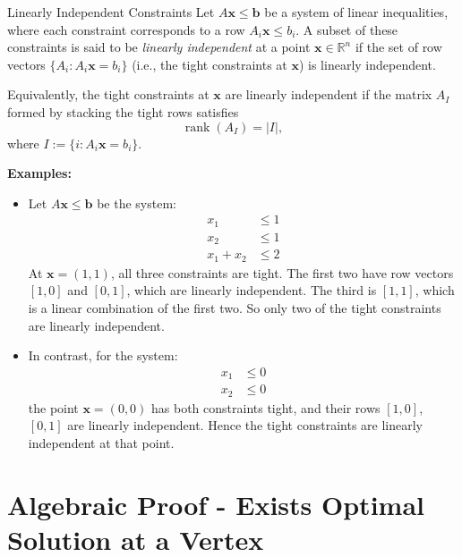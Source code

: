 \vspace{1em}

\begin{definition}{Linearly Independent Constraints}{}
Let \( A \mathbf{x} \leq \mathbf{b} \) be a system of linear inequalities, where each constraint corresponds to a row \( A_i \mathbf{x} \leq b_i \). A subset of these constraints is said to be \emph{linearly independent} at a point \( \mathbf{x} \in \mathbb{R}^n \) if the set of row vectors \( \{ A_i : A_i \mathbf{x} = b_i \} \) (i.e., the tight constraints at \( \mathbf{x} \)) is linearly independent.

Equivalently, the tight constraints at \( \mathbf{x} \) are linearly independent if the matrix \( A_I \) formed by stacking the tight rows satisfies
\[
\operatorname{rank}(A_I) = |I|,
\]
where \( I := \{ i : A_i \mathbf{x} = b_i \} \).
\end{definition}

\textbf{Examples:}
\begin{itemize}
    \item Let \( A \mathbf{x} \leq \mathbf{b} \) be the system:
    \[
    \begin{aligned}
    x_1 &\leq 1 \\
    x_2 &\leq 1 \\
    x_1 + x_2 &\leq 2
    \end{aligned}
    \]
    At \( \mathbf{x} = (1, 1) \), all three constraints are tight. The first two have row vectors \( [1,0] \) and \( [0,1] \), which are linearly independent. The third is \( [1,1] \), which is a linear combination of the first two. So only two of the tight constraints are linearly independent.
    
    \item In contrast, for the system:
    \[
    \begin{aligned}
    x_1 &\leq 0 \\
    x_2 &\leq 0
    \end{aligned}
    \]
    the point \( \mathbf{x} = (0,0) \) has both constraints tight, and their rows \( [1,0] \), \( [0,1] \) are linearly independent. Hence the tight constraints are linearly independent at that point.
\end{itemize}

\section{Algebraic Proof - Exists Optimal Solution at a Vertex}\label{sec:algebraic-vertex-proof}


